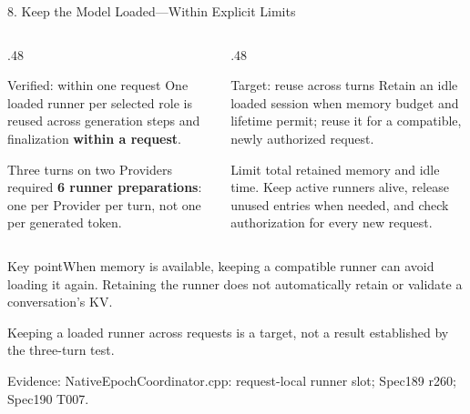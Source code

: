 \documentclass[10pt,aspectratio=169]{beamer}
\newcommand{\src}[1]{\vfill{\fontsize{6.5}{8}\selectfont\color{Gray}Evidence: #1\par}}
\newcommand{\point}[1]{\begin{block}{Key point}\small #1\end{block}}
\begin{document}
\begin{frame}{8. Keep the Model Loaded---Within Explicit Limits}
\begin{columns}[T]
\begin{column}{.48\textwidth}
\begin{block}{Verified: within one request}\small
One loaded runner per selected role is reused across generation steps and finalization \textbf{within a request}.

\medskip Three turns on two Providers required \textbf{6 runner preparations}: one per Provider per turn, not one per generated token.
\end{block}
\end{column}
\begin{column}{.48\textwidth}
\begin{block}{Target: reuse across turns}\small
Retain an idle loaded session when memory budget and lifetime permit; reuse it for a compatible, newly authorized request.

\medskip Limit total retained memory and idle time. Keep active runners alive, release unused entries when needed, and check authorization for every new request.
\end{block}
\end{column}
\end{columns}
\point{When memory is available, keeping a compatible runner can avoid loading it again. Retaining the runner does not automatically retain or validate a conversation's KV.}
\small Keeping a loaded runner across requests is a target, not a result established by the three-turn test.
\src{NativeEpochCoordinator.cpp: request-local runner slot; Spec189 r260; Spec190 T007.}
\end{frame}
\end{document}
